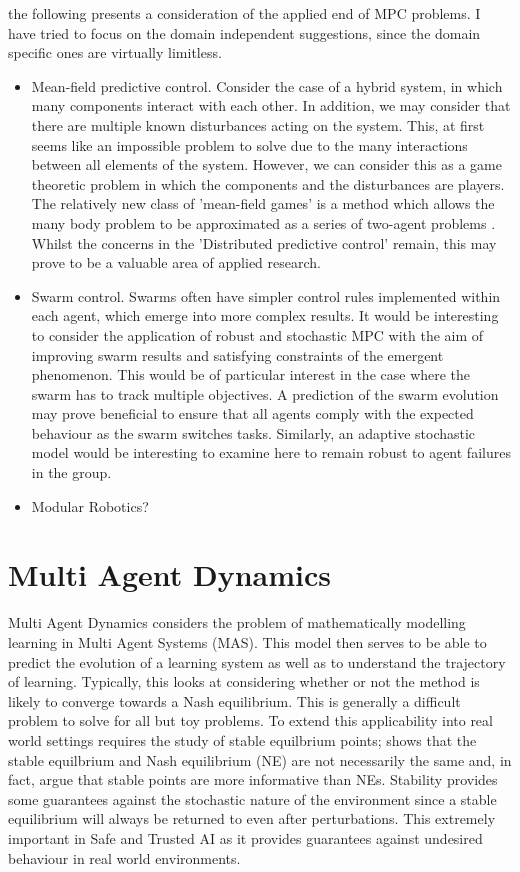 \documentclass[preprint,11pt]{report}
\begin{document}
the following presents a consideration of the applied end of MPC problems. I have tried to focus on
the domain independent suggestions, since the domain specific ones are virtually limitless.

\begin{itemize}
	\item Mean-field predictive control. Consider the case of a hybrid system, in which many components
	interact with each other. In addition, we may consider that there are multiple known disturbances
	acting on the system. This, at first seems like an impossible problem to solve due to the many
	interactions between all elements of the system. However, we can consider this as a game
	theoretic problem in which the components and the disturbances are players. The relatively new
	class of 'mean-field games' is a method which allows the many body problem to be approximated as
	a series of two-agent problems \cite{Yang2018}. Whilst the concerns in the 'Distributed
	predictive control' remain, this may prove to be a valuable area of applied research.
	\item Swarm control. Swarms often have simpler control rules implemented within each agent,
	which emerge into more complex results. It would be interesting to consider the application of
	robust and stochastic MPC with the aim of improving swarm results and satisfying constraints of
	the emergent phenomenon. This would be of particular interest in the case where the swarm has to
	track multiple objectives. A prediction of the swarm evolution may prove beneficial to ensure
	that all agents comply with the expected behaviour as the swarm switches tasks. Similarly, an
	adaptive stochastic model would be interesting to examine here to remain robust to agent
	failures in the group.
	\item Modular Robotics?
\end{itemize}

\section*{Multi Agent Dynamics}

Multi Agent Dynamics considers the problem of mathematically modelling learning in Multi Agent
Systems (MAS). This model then serves to be able to predict the evolution of a learning system as
well as to understand the trajectory of learning. Typically, this looks at considering whether or
not the method is likely to converge towards a Nash equilibrium. This is generally a difficult
problem to solve \cite{ShohamMultiagentFoundations} for all but toy problems. To extend this
applicability into real world settings requires the study of stable equilbrium points;
\cite{Letcher2019DifferentiableMechanics} shows that the stable equilbrium and Nash equilibrium (NE)
are not necessarily the same and, in fact, argue that stable points are more informative than NEs.
Stability provides some guarantees against the stochastic nature of the environment since a stable
equilibrium will always be returned to even after perturbations. This extremely important in Safe
and Trusted AI as it provides guarantees against undesired behaviour in real world
environments. 
\end{document}
